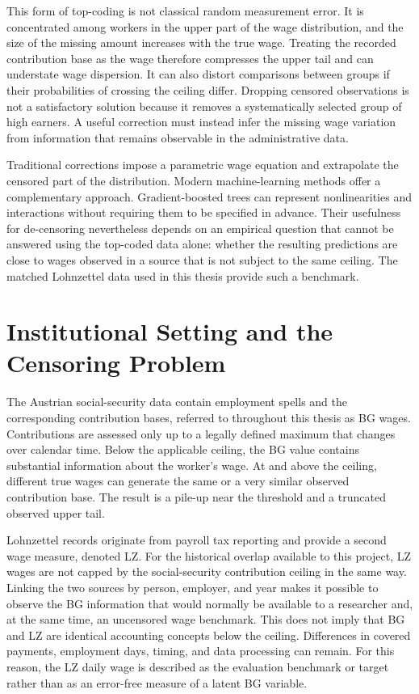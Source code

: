 \documentclass[12pt,a4paper,oneside,titlepage]{book}
\begin{document}
This form of top-coding is not classical random measurement error. It is concentrated among workers in the upper part of the wage distribution, and the size of the missing amount increases with the true wage. Treating the recorded contribution base as the wage therefore compresses the upper tail and can understate wage dispersion. It can also distort comparisons between groups if their probabilities of crossing the ceiling differ. Dropping censored observations is not a satisfactory solution because it removes a systematically selected group of high earners. A useful correction must instead infer the missing wage variation from information that remains observable in the administrative data.

Traditional corrections impose a parametric wage equation and extrapolate the censored part of the distribution. Modern machine-learning methods offer a complementary approach. Gradient-boosted trees can represent nonlinearities and interactions without requiring them to be specified in advance. Their usefulness for de-censoring nevertheless depends on an empirical question that cannot be answered using the top-coded data alone: whether the resulting predictions are close to wages observed in a source that is not subject to the same ceiling. The matched Lohnzettel data used in this thesis provide such a benchmark.

\section{Institutional Setting and the Censoring Problem}
The Austrian social-security data contain employment spells and the corresponding contribution bases, referred to throughout this thesis as BG wages. Contributions are assessed only up to a legally defined maximum that changes over calendar time. Below the applicable ceiling, the BG value contains substantial information about the worker's wage. At and above the ceiling, different true wages can generate the same or a very similar observed contribution base. The result is a pile-up near the threshold and a truncated observed upper tail.

Lohnzettel records originate from payroll tax reporting and provide a second wage measure, denoted LZ. For the historical overlap available to this project, LZ wages are not capped by the social-security contribution ceiling in the same way. Linking the two sources by person, employer, and year makes it possible to observe the BG information that would normally be available to a researcher and, at the same time, an uncensored wage benchmark. This does not imply that BG and LZ are identical accounting concepts below the ceiling. Differences in covered payments, employment days, timing, and data processing can remain. For this reason, the LZ daily wage is described as the evaluation benchmark or target rather than as an error-free measure of a latent BG variable.
\end{document}
